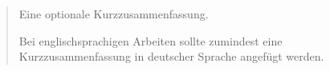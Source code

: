 %

\begin{abstract}
Eine optionale Kurzzusammenfassung.

Bei englischsprachigen Arbeiten sollte zumindest eine Kurzzusammenfassung in deutscher Sprache angefügt werden.
\end{abstract}
